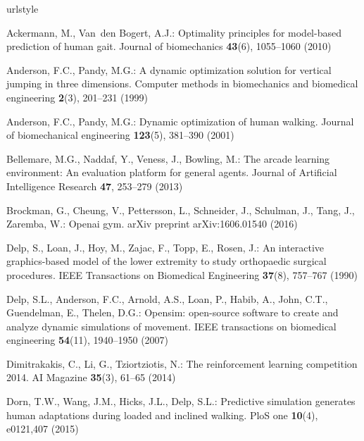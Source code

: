 \documentclass[graybox]{svmult}
\begin{document}
\begin{thebibliography}{10}
\providecommand{\url}[1]{{#1}}
\providecommand{\urlprefix}{URL }
\expandafter\ifx\csname urlstyle\endcsname\relax
  \providecommand{\doi}[1]{DOI~\discretionary{}{}{}#1}\else
  \providecommand{\doi}{DOI~\discretionary{}{}{}\begingroup
  \urlstyle{rm}\Url}\fi

Ackermann, M., Van~den Bogert, A.J.: Optimality principles for model-based
  prediction of human gait.
\newblock Journal of biomechanics \textbf{43}(6), 1055--1060 (2010)

Anderson, F.C., Pandy, M.G.: A dynamic optimization solution for vertical
  jumping in three dimensions.
\newblock Computer methods in biomechanics and biomedical engineering
  \textbf{2}(3), 201--231 (1999)

Anderson, F.C., Pandy, M.G.: Dynamic optimization of human walking.
\newblock Journal of biomechanical engineering \textbf{123}(5), 381--390 (2001)

{Bellemare}, M.G., {Naddaf}, Y., {Veness}, J., {Bowling}, M.: The arcade
  learning environment: An evaluation platform for general agents.
\newblock Journal of Artificial Intelligence Research \textbf{47}, 253--279
  (2013)

Brockman, G., Cheung, V., Pettersson, L., Schneider, J., Schulman, J., Tang,
  J., Zaremba, W.: Openai gym.
\newblock arXiv preprint arXiv:1606.01540  (2016)

Delp, S., Loan, J., Hoy, M., Zajac, F., Topp, E., Rosen, J.: An interactive
  graphics-based model of the lower extremity to study orthopaedic surgical
  procedures.
\newblock IEEE Transactions on Biomedical Engineering \textbf{37}(8), 757--767
  (1990)

Delp, S.L., Anderson, F.C., Arnold, A.S., Loan, P., Habib, A., John, C.T.,
  Guendelman, E., Thelen, D.G.: Opensim: open-source software to create and
  analyze dynamic simulations of movement.
\newblock IEEE transactions on biomedical engineering \textbf{54}(11),
  1940--1950 (2007)

Dimitrakakis, C., Li, G., Tziortziotis, N.: The reinforcement learning
  competition 2014.
\newblock AI Magazine \textbf{35}(3), 61--65 (2014)

Dorn, T.W., Wang, J.M., Hicks, J.L., Delp, S.L.: Predictive simulation
  generates human adaptations during loaded and inclined walking.
\newblock PloS one \textbf{10}(4), e0121,407 (2015)


\end{thebibliography}
\end{document}
